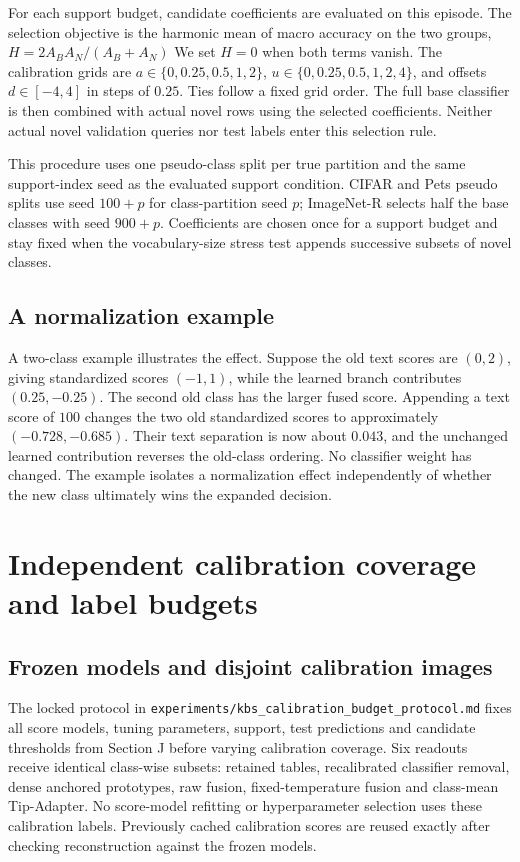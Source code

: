 \documentclass[preprint,review,12pt]{elsarticle}
\begin{document}
For each support budget, candidate coefficients are evaluated on this episode. The selection objective is the harmonic mean of macro accuracy on the two groups,
$H=2A_BA_N/(A_B+A_N)$
We set $H=0$ when both terms vanish. The calibration grids are $a\in\{0,0.25,0.5,1,2\}$, $u\in\{0,0.25,0.5,1,2,4\}$, and offsets $d\in[-4,4]$ in steps of $0.25$. Ties follow a fixed grid order. The full base classifier is then combined with actual novel rows using the selected coefficients. Neither actual novel validation queries nor test labels enter this selection rule.

This procedure uses one pseudo-class split per true partition and the same support-index seed as the evaluated support condition. CIFAR and Pets pseudo splits use seed $100+p$ for class-partition seed $p$; ImageNet-R selects half the base classes with seed $900+p$. Coefficients are chosen once for a support budget and stay fixed when the vocabulary-size stress test appends successive subsets of novel classes.

\subsection{A normalization example}
A two-class example illustrates the effect. Suppose the old text scores are $(0,2)$, giving standardized scores $(-1,1)$, while the learned branch contributes $(0.25,-0.25)$. The second old class has the larger fused score. Appending a text score of $100$ changes the two old standardized scores to approximately $(-0.728,-0.685)$. Their text separation is now about $0.043$, and the unchanged learned contribution reverses the old-class ordering. No classifier weight has changed. The example isolates a normalization effect independently of whether the new class ultimately wins the expanded decision.

\FloatBarrier
\section{Independent calibration coverage and label budgets}
\label{app:calibrationbudget}
\subsection{Frozen models and disjoint calibration images}
The locked protocol in \nolinkurl{experiments/kbs_calibration_budget_protocol.md} fixes all score models, tuning parameters, support, test predictions and candidate thresholds from Section J before varying calibration coverage. Six readouts receive identical class-wise subsets: retained tables, recalibrated classifier removal, dense anchored prototypes, raw fusion, fixed-temperature fusion and class-mean Tip-Adapter. No score-model refitting or hyperparameter selection uses these calibration labels. Previously cached calibration scores are reused exactly after checking reconstruction against the frozen models.
\end{document}
